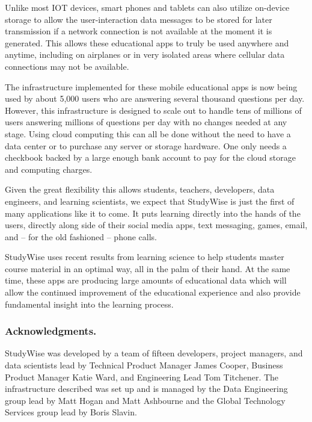 \documentclass[runningheads,a4paper]{llncs}
\begin{document}
Unlike most IOT devices, smart phones and tablets can also utilize on-device storage to allow the user-interaction data messages to be stored for later transmission if a network connection is not available at the moment it is generated.  This allows these educational apps to truly be used anywhere and anytime, including on airplanes or in very isolated areas where cellular data connections may not be available.

The infrastructure implemented for these mobile educational apps is now being used by about 5,000 users who are answering several thousand questions per day.  However, this infrastructure is designed to scale out to handle tens of millions of users answering millions of questions per day with no changes needed at any stage.  Using cloud computing this can all be done without the need to have a data center or to purchase any server or storage hardware.  One only needs a checkbook backed by a large enough bank account to pay for the cloud storage and computing charges.

Given the great flexibility this allows students, teachers, developers, data engineers, and learning scientists, we expect that StudyWise is just the first of many applications like it to come.  It puts learning directly into the hands of the users, directly along side of their social media apps, text messaging, games, email, and -- for the old fashioned -- phone calls.  

StudyWise uses recent results from learning science to help students master course material in an optimal way, all in the palm of their hand.  At the same time, these apps are producing large amounts of educational data which will allow the continued improvement of the educational experience and also provide fundamental insight into the learning process.

\subsubsection*{Acknowledgments.} StudyWise was developed by a team of  fifteen developers, project managers, and data scientists lead by Technical Product Manager James Cooper, Business Product Manager Katie Ward, and Engineering Lead Tom Titchener.  The infrastructure described was set up and is managed by the Data Engineering group lead by Matt Hogan and Matt Ashbourne and the Global Technology Services group lead by Boris Slavin.




\end{document}
